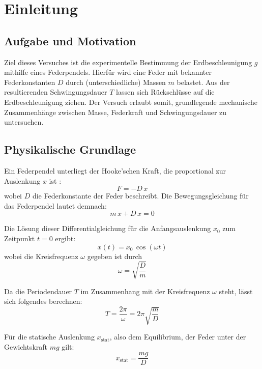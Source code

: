 \chapter{Einleitung}

\section{Aufgabe und Motivation}
Ziel dieses Versuches ist die experimentelle Bestimmung der Erdbeschleunigung $g$ mithilfe eines Federpendels. Hierfür wird eine Feder mit bekannter Federkonstanten $D$ durch (unterschiedliche) Massen $m$ belastet. Aus der resultierenden Schwingungsdauer $T$ lassen sich Rückschlüsse auf die Erdbeschleunigung ziehen. Der Versuch erlaubt somit, grundlegende mechanische Zusammenhänge zwischen Masse, Federkraft und Schwingungsdauer zu untersuchen.

\section{Physikalische Grundlage}
Ein Federpendel unterliegt der Hooke'schen Kraft, die proportional zur Auslenkung $x$ ist \cite{skript25,demtroeder17}:
\begin{equation}
    F = -D \, x
    \label{eq:hooke}
\end{equation}
wobei $D$ die Federkonstante der Feder beschreibt. Die Bewegungsgleichung für das Federpendel lautet demnach:
\begin{equation}
    m \, \ddot{x} + D \, x = 0
    \label{eq:bewegung}
\end{equation}

Die Lösung dieser Differentialgleichung für die Anfangsauslenkung $x_0$ zum Zeitpunkt $t = 0$ ergibt:
\begin{equation}
    x(t) = x_0 \, \cos(\omega t)
    \label{eq:loesung}
\end{equation}
wobei die Kreisfrequenz $\omega$ gegeben ist durch
\begin{equation}
    \omega = \sqrt{\frac{D}{m}}
    \label{eq:kreisfrequenz}
\end{equation}

Da die Periodendauer $T$ im Zusammenhang mit der Kreisfrequenz $\omega$ steht, lässt sich folgendes berechnen:
\begin{equation}
    T = \frac{2 \pi}{\omega} = 2 \pi \sqrt{\frac{m}{D}}
    \label{eq:periodendauer}
\end{equation}

Für die statische Auslenkung $x_\text{stat}$, also dem Equilibrium, der Feder unter der Gewichtskraft $mg$ gilt:
\begin{equation}
    x_\text{stat} = \frac{mg}{D}
    \label{eq:stat_ausslenkung}
\end{equation}

